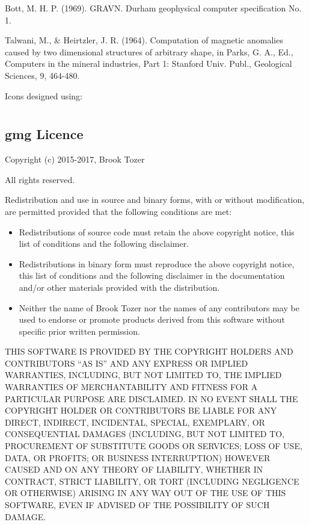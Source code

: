 \documentclass[a4paper,12pt,english]{sphinxmanual}
\begin{document}

Bott, M. H. P. (1969). GRAVN. Durham geophysical computer specification No. 1.


Talwani, M., \& Heirtzler, J. R. (1964). Computation of magnetic anomalies caused by two dimensional structures of
arbitrary shape, in Parks, G. A., Ed., Computers in the mineral industries, Part 1: Stanford Univ. Publ., Geological
Sciences, 9, 464-480.


Icons designed using: 


\chapter{}
\label{\detokenize{licence::doc}}\label{\detokenize{licence:licencing}}\label{\detokenize{licence:licence}}

\section{gmg Licence}
\label{\detokenize{licence:gmg-licence}}
Copyright (c) 2015-2017, Brook Tozer

All rights reserved.

Redistribution and use in source and binary forms, with or without modification,
are permitted provided that the following conditions are met:
\begin{itemize}
\item {} 
Redistributions of source code must retain the above copyright notice,
this list of conditions and the following disclaimer.

\item {} 
Redistributions in binary form must reproduce the above copyright notice,
this list of conditions and the following disclaimer in the documentation
and/or other materials provided with the distribution.

\item {} 
Neither the name of Brook Tozer nor the names of any contributors
may be used to endorse or promote products derived from this software
without specific prior written permission.

\end{itemize}

THIS SOFTWARE IS PROVIDED BY THE COPYRIGHT HOLDERS AND CONTRIBUTORS “AS IS” AND
ANY EXPRESS OR IMPLIED WARRANTIES, INCLUDING, BUT NOT LIMITED TO, THE IMPLIED
WARRANTIES OF MERCHANTABILITY AND FITNESS FOR A PARTICULAR PURPOSE ARE
DISCLAIMED. IN NO EVENT SHALL THE COPYRIGHT HOLDER OR CONTRIBUTORS BE LIABLE FOR
ANY DIRECT, INDIRECT, INCIDENTAL, SPECIAL, EXEMPLARY, OR CONSEQUENTIAL DAMAGES
(INCLUDING, BUT NOT LIMITED TO, PROCUREMENT OF SUBSTITUTE GOODS OR SERVICES;
LOSS OF USE, DATA, OR PROFITS; OR BUSINESS INTERRUPTION) HOWEVER CAUSED AND ON
ANY THEORY OF LIABILITY, WHETHER IN CONTRACT, STRICT LIABILITY, OR TORT
(INCLUDING NEGLIGENCE OR OTHERWISE) ARISING IN ANY WAY OUT OF THE USE OF THIS
SOFTWARE, EVEN IF ADVISED OF THE POSSIBILITY OF SUCH DAMAGE.
\end{document}
